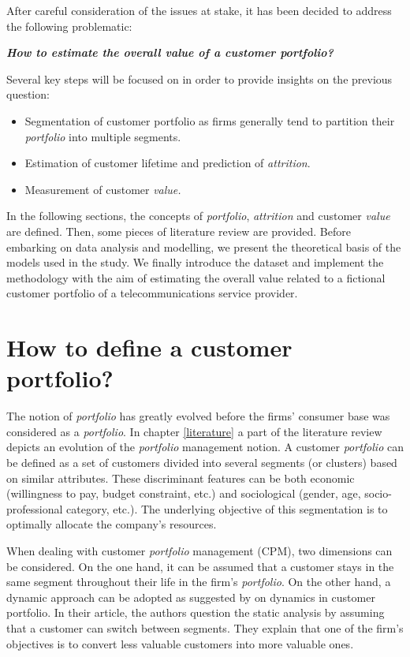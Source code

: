 \documentclass[
]{book}
\providecommand{\tightlist}{%
  \setlength{\itemsep}{0pt}\setlength{\parskip}{0pt}}
\begin{document}
After careful consideration of the issues at stake, it has been decided to address the following problematic:

\textbf{\emph{How to estimate the overall value of a customer portfolio?}}

Several key steps will be focused on in order to provide insights on the previous question:

\begin{itemize}
\tightlist
\item
  Segmentation of customer portfolio as firms generally tend to partition their \emph{portfolio} into multiple segments.
\item
  Estimation of customer lifetime and prediction of \emph{attrition}.
\item
  Measurement of customer \emph{value.}
\end{itemize}

In the following sections, the concepts of \emph{portfolio}, \emph{attrition} and customer \emph{value} are defined. Then, some pieces of literature review are provided. Before embarking on data analysis and modelling, we present the theoretical basis of the models used in the study. We finally introduce the dataset and implement the methodology with the aim of estimating the overall value related to a fictional customer portfolio of a telecommunications service provider.

\hypertarget{portfoliodef}{%
\section{How to define a customer portfolio?}\label{portfoliodef}}

The notion of \emph{portfolio} has greatly evolved before the firms' consumer base was considered as a \emph{portfolio}. In chapter \ref{literature} a part of the literature review depicts an evolution of the \emph{portfolio} management notion. A customer \emph{portfolio} can be defined as a set of customers divided into several segments (or clusters) based on similar attributes. These discriminant features can be both economic (willingness to pay, budget constraint, etc.) and sociological (gender, age, socio-professional category, etc.). The underlying objective of this segmentation is to optimally allocate the company's resources.

When dealing with customer \emph{portfolio} management (CPM), two dimensions can be considered. On the one hand, it can be assumed that a customer stays in the same segment throughout their life in the firm's \emph{portfolio}. On the other hand, a dynamic approach can be adopted as suggested by \citet{MANAGING_DYNAMICS_CUSTOMER_PORTFOLIO} on dynamics in customer portfolio. In their article, the authors question the static analysis by assuming that a customer can switch between segments. They explain that one of the firm's objectives is to convert less valuable customers into more valuable ones.
\end{document}
